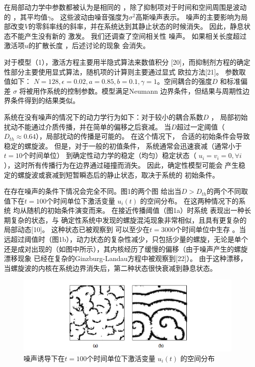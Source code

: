 \documentclass[
    bachelor,
    nofont, %
    pdflinks,
    ]{xjtuthesis}
\begin{document}
\medskip
在局部动⼒学中参数都被认为是相同的
，除了抑制项对于时间和空间周围是波动的
，其平均值$\gamma$。 这些波动由噪⾳强度为$\sigma^2$⾼斯噪声表⽰。 噪声的主要影响为局部改变$V$的零斜率线的斜率，并在系统达到其静⽌状态的时候消失。 因此，静息状态不能产生没有新的
激发。 我们还调查了空间相关性
噪声。 如果相关长度超过激活项$u$的扩散长度 ，后述讨论的现象
会消失。

\medskip
对于模型（1），激活方程主要⽤半隐式算法来数值积分
[20]，而抑制剂⽅程的确定性部分主要使用显式算法，随机项的计算则主要通过显式
欧拉⽅法[21]。 参数取值如下： $N = 128,\epsilon = 0.02,a = 0.85,b = 0.1,\gamma = 1$。空间耦合的强度$D$ 和标准偏差
$\sigma$ 将被⽤作系统的控制参数。模型满足Neumann
边界条件，但结果与周期性边界条件得到的结果类似。

\medskip
系统在没有噪声的情况下的动力学行为如下：对于较小的耦合系数$D$ ，
局部初始扰动不能通过介质传播，并在简单的偏移之后衰减。 当$D$超过⼀定阈值（$D_{th} \approx 0.64$），局部扰动的传播是可能的。 在这个情况下，
合适的初始条件会导致稳定的螺旋波。 但是，对于⼀般的初值条件，
系统通常会迅速衰减（通常⼩于 $t = 10$个时间单位）
到确定性动⼒学的稳定（均匀）稳定状态（ $u_i = v_i = 0,\forall i$ ），这时所有传播行为在边界通过碰撞而消失。 因此，确定性模型可能会
产生稳定的螺旋波或衰减到短暂瞬态后的静⽌状态，取决于系统的
初始条件。

\medskip
在存在噪声的条件下情况会完全不同。图1的两个图
给出当$D> D_{th}$的两个不同取值下在$t = 100$个时间单位下激活变量 $u_i(t)$ 的空间分布。 在这两种情况下的系统
均从随机的初始条件演变⽽来。 在接近传播阈值（图1a）时系统
表现出⼀种长期复杂的状态，与
确定性系统中发现的螺旋混沌现象⾮常相似，且具有更复杂的局部动态[10]。 这种状态已被观察到
可以⾄少在$ t = 3000$个时间单位中⽣存 。当远超过阈值时（图1b），动⼒状态的复杂性减少，只包括少量的螺旋，⽆论是单个还是成对出现的（如图中所⽰），其内核经历了缓慢的偏移（由于噪声产生的螺旋漂移现象
已经在复杂的Ginzburg-Landau方程中被观察到[22]）。 由于这种漂移，当螺旋波的内核在系统边界消失后，第二种状态很快衰减到静息状态。

\begin{figure}[!ht]
\centering
\includegraphics[scale=0.68]{fig1.png}
\caption{噪声诱导下在$t = 100$个时间单位下激活变量 $u_i(t)$ 的空间分布}
\end{figure}
\end{document}

